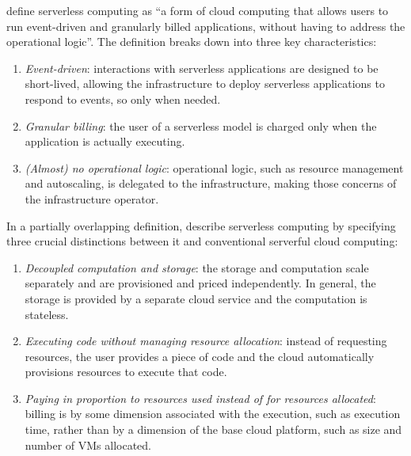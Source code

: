 \textcite{van2017spec} define serverless computing as ``a form of cloud computing that allows users to run event-driven and granularly billed applications, without having to address the operational logic''. The definition breaks down into three key characteristics: \begin{enumerate}
  \item \textit{Event-driven}: interactions with serverless applications are designed to be short-lived, allowing the infrastructure to deploy serverless applications to respond to events, so only when needed.
  \item \textit{Granular billing}: the user of a serverless model is charged only when the application is actually executing.
  \item \textit{(Almost) no operational logic}: operational logic, such as resource management and autoscaling, is delegated to the infrastructure, making those concerns of the infrastructure operator.
\end{enumerate}

In a partially overlapping definition, \textcite{jonas19berkeleyView} describe serverless computing by specifying three crucial distinctions between it and conventional serverful cloud computing: \begin{enumerate}
  \item \textit{Decoupled computation and storage}: the storage and computation scale separately and are provisioned and priced independently. In general, the storage is provided by a separate cloud service and the computation is stateless.
  \item \textit{Executing code without managing resource allocation}: instead of requesting resources, the user provides a piece of code and the cloud automatically provisions resources to execute that code.
  \item \textit{Paying in proportion to resources used instead of for resources allocated}: billing is by some dimension associated with the execution, such as execution time, rather than by a dimension of the base cloud platform, such as size and number of VMs allocated.
\end{enumerate}

